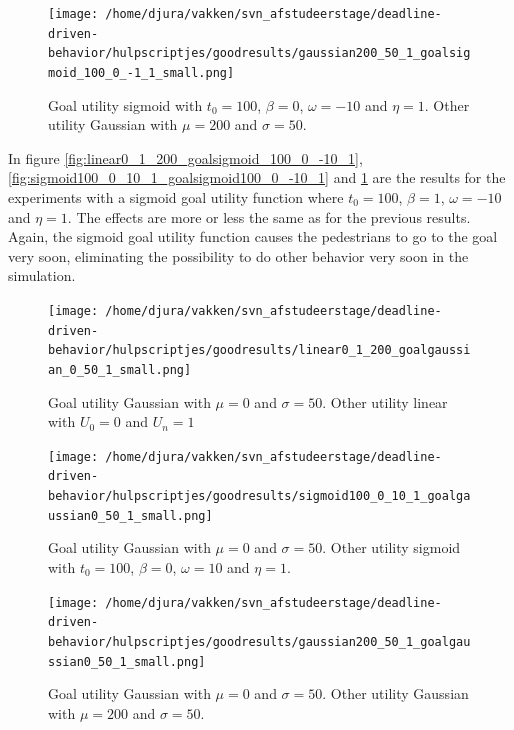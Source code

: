 \documentclass[11pt, a4paper]{book}
\begin{document}
\begin{figure}[h!]
\centering
\texttt{[image: /home/djura/vakken/svn\_afstudeerstage/deadline-driven-behavior/hulpscriptjes/goodresults/gaussian200\_50\_1\_goalsigmoid\_100\_0\_-1\_1\_small.png]}
\caption{Goal utility sigmoid with $t_0=100$, $\beta=0$, $\omega=-10$ and $\eta=1$. Other utility Gaussian with $\mu=200$ and $\sigma=50$.}
\label{fig:gaussian200_50_1_goalsigmoid_100_0_-10_1}
\end{figure}

In figure \ref{fig:linear0_1_200_goalsigmoid_100_0_-10_1}, \ref{fig:sigmoid100_0_10_1_goalsigmoid100_0_-10_1} and \ref{fig:gaussian200_50_1_goalsigmoid_100_0_-10_1} are the results for the experiments with a sigmoid goal utility function where $t_0=100$, $\beta=1$, $\omega=-10$ and $\eta=1$. The effects are more or less the same as for the previous results. Again, the sigmoid goal utility function causes the pedestrians to go to the goal very soon, eliminating the possibility to do other behavior very soon in the simulation.
\begin{figure}[h!]
\centering
\texttt{[image: /home/djura/vakken/svn\_afstudeerstage/deadline-driven-behavior/hulpscriptjes/goodresults/linear0\_1\_200\_goalgaussian\_0\_50\_1\_small.png]}
\caption{Goal utility Gaussian with $\mu=0$ and $\sigma=50$. Other utility linear with $U_0=0$ and $U_n=1$}
\label{fig:linear0_1_200_goalgaussian_0_50_1}
\end{figure}

\begin{figure}[h!]
\centering
\texttt{[image: /home/djura/vakken/svn\_afstudeerstage/deadline-driven-behavior/hulpscriptjes/goodresults/sigmoid100\_0\_10\_1\_goalgaussian0\_50\_1\_small.png]}
\caption{Goal utility Gaussian with $\mu=0$ and $\sigma=50$. Other utility sigmoid with $t_0=100$, $\beta=0$, $\omega=10$ and $\eta=1$.}
\label{fig:sigmoid100_0_10_1_goalgaussian0_50_1}
\end{figure}

\begin{figure}[h!]
\centering
\texttt{[image: /home/djura/vakken/svn\_afstudeerstage/deadline-driven-behavior/hulpscriptjes/goodresults/gaussian200\_50\_1\_goalgaussian0\_50\_1\_small.png]}
\caption{Goal utility Gaussian with $\mu=0$ and $\sigma=50$. Other utility Gaussian with $\mu=200$ and $\sigma=50$.}
\label{fig:gaussian200_50_1_goalgaussian0_50_1}
\end{figure}
\end{document}
